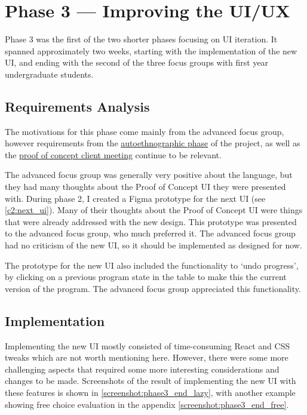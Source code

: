 \chapter{Phase 3 --- Improving the UI/UX}
Phase 3 was the first of the two shorter phases focusing on UI iteration. It spanned approximately two weeks, starting with the implementation of the new UI, and ending with the second of the three focus groups with first year undergraduate students. 

\section{Requirements Analysis}
The motivations for this phase come mainly from the advanced focus group, however requirements from the \hyperref[sec:c1_autoethnography]{autoethnographic phase} of the project, as well as the \hyperref[eval:c1]{proof of concept client meeting} continue to be relevant. 

The advanced focus group was generally very positive about the language, but they had many thoughts about the Proof of Concept UI they were presented with. During phase 2, I created a Figma prototype for the next UI (see \ref{c2:next_ui}). Many of their thoughts about the Proof of Concept UI were things that were already addressed with the new design. This prototype was presented to the advanced focus group, who much preferred it. The advanced focus group had no criticism of the new UI, so it should be implemented as designed for now. 

The prototype for the new UI also included the functionality to `undo progress', by clicking on a previous program state in the table to make this the current version of the program. The advanced focus group appreciated this functionality. 




\section{Implementation}
Implementing the new UI mostly consisted of time-consuming React and CSS tweaks which are not worth mentioning here. However, there were some more challenging aspects that required some more interesting considerations and changes to be made. Screenshots of the result of implementing the new UI with these features is shown in \ref{screenshot:phase3_end_lazy}, with another example showing free choice evaluation in the appendix \ref{screenshot:phase3_end_free}. 


